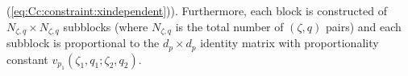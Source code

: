 (\ref{eq:Cc:constraint:xindependent})). %
Furthermore, each block is constructed of $N_{\zeta,q}\times N_{\zeta,q}$
subblocks (where $N_{\zeta,q}$ is the total number of $(\zeta,q)$ pairs)
and each subblock is proportional to the $d_p\times d_p$ identity matrix
with proportionality constant $v_{p_1}(\zeta_1,q_1;\zeta_2,q_2)$.
